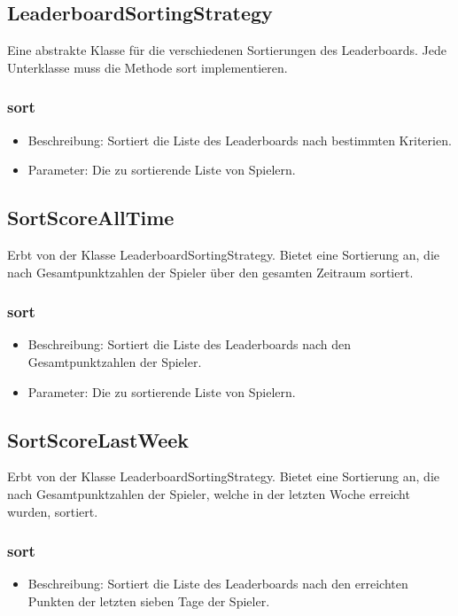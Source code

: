 \documentclass[a4paper]{scrreprt}
\begin{document}
	\subsection{LeaderboardSortingStrategy}
	Eine abstrakte Klasse für die verschiedenen Sortierungen des Leaderboards. Jede Unterklasse muss die Methode sort implementieren.
	\subsubsection{sort}
	\begin{itemize}
		\item Beschreibung: Sortiert die Liste des Leaderboards nach bestimmten Kriterien.
		\item Parameter: Die zu sortierende Liste von Spielern.
	\end{itemize}

	\subsection{SortScoreAllTime}
	Erbt von der Klasse LeaderboardSortingStrategy. Bietet eine Sortierung an, die nach Gesamtpunktzahlen der Spieler über den gesamten Zeitraum sortiert.
	\subsubsection{sort}
	\begin{itemize}
		\item Beschreibung: Sortiert die Liste des Leaderboards nach den Gesamtpunktzahlen der Spieler.
		\item Parameter: Die zu sortierende Liste von Spielern.
	\end{itemize}

	\subsection{SortScoreLastWeek}
	Erbt von der Klasse LeaderboardSortingStrategy. Bietet eine Sortierung an, die nach Gesamtpunktzahlen der Spieler, welche in der letzten Woche erreicht wurden, sortiert.
	\subsubsection{sort}
	\begin{itemize}
		\item Beschreibung: Sortiert die Liste des Leaderboards nach den erreichten Punkten der letzten sieben Tage der Spieler.
	\end{itemize}
\end{document}
